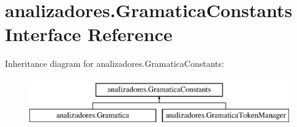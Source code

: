 \hypertarget{interfaceanalizadores_1_1_gramatica_constants}{}\section{analizadores.\+Gramatica\+Constants Interface Reference}
\label{interfaceanalizadores_1_1_gramatica_constants}
Inheritance diagram for analizadores.\+Gramatica\+Constants\+:\begin{figure}[H]
\begin{center}
\leavevmode
\includegraphics[height=2.000000cm]{interfaceanalizadores_1_1_gramatica_constants}
\end{center}
\end{figure}
